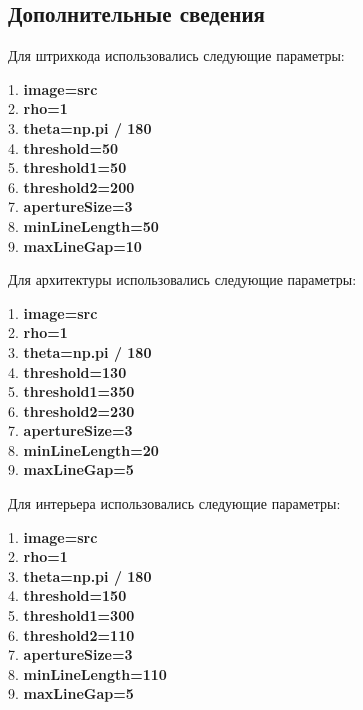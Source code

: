 \documentclass[a4paper, 16pt]{article}
\begin{document}
    \subsection{Дополнительные сведения}
    \noindent Для штрихкода использовались следующие параметры:
    \begin{center}
        1. \textbf{image=src}\\
        2. \textbf{rho=1}\\
        3. \textbf{theta=np.pi / 180}\\
        4. \textbf{threshold=50}\\
        5. \textbf{threshold1=50}\\
        6. \textbf{threshold2=200}\\
        7. \textbf{apertureSize=3}\\
        8. \textbf{minLineLength=50}\\
        9. \textbf{maxLineGap=10}
    \end{center}


    \noindent Для архитектуры использовались следующие параметры:
    \begin{center}
        1. \textbf{image=src}\\
        2. \textbf{rho=1}\\
        3. \textbf{theta=np.pi / 180}\\
        4. \textbf{threshold=130}\\
        5. \textbf{threshold1=350}\\
        6. \textbf{threshold2=230}\\
        7. \textbf{apertureSize=3}\\
        8. \textbf{minLineLength=20}\\
        9. \textbf{maxLineGap=5}
    \end{center}


    \noindent Для интерьера использовались следующие параметры:
    \begin{center}
        1. \textbf{image=src}\\
        2. \textbf{rho=1}\\
        3. \textbf{theta=np.pi / 180}\\
        4. \textbf{threshold=150}\\
        5. \textbf{threshold1=300}\\
        6. \textbf{threshold2=110}\\
        7. \textbf{apertureSize=3}\\
        8. \textbf{minLineLength=110}\\
        9. \textbf{maxLineGap=5}
    \end{center}
\end{document}

